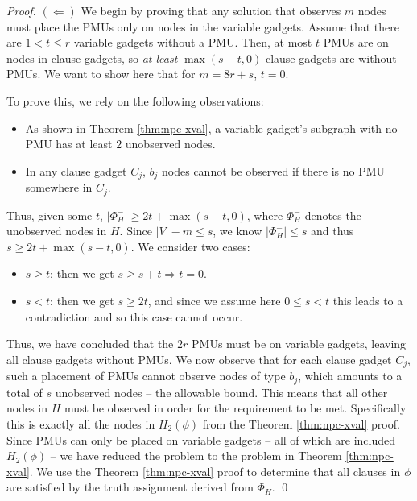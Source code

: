 \begin{proof}
$(\Leftarrow)$
We begin by proving that any solution that observes $m$ nodes must place the PMUs only on nodes in the variable gadgets. Assume that there are $1<t\leq r$ variable gadgets without a PMU.
Then, at most $t$ PMUs are on nodes in clause gadgets, so {\it at least} $\max(s-t,0)$ clause gadgets are without PMUs. We want to show here that for $m=8r+s$, $t=0$.

To prove this, we rely on the following observations:
\begin{itemize}
	\item As shown in Theorem \ref{thm:npc-xval}, a variable gadget's subgraph with no PMU has at least $2$ unobserved nodes.
	\item In any clause gadget $C_j$, $b_j$ nodes cannot be observed if there is no PMU somewhere in $C_j$.
\end{itemize}
Thus, given some $t$, $|\Phi_H^-| \geq 2t + \max(s-t, 0)$, where $\Phi_H^-$ denotes the unobserved nodes in $H$. Since $|V|-m \leq s$, we know $|\Phi_H^-|\leq s$ and thus 
$s \geq 2t + \max(s-t, 0)$. We consider two cases:
\begin{itemize}
	\item $s\geq t$: then we get $s \geq s+t \Rightarrow t=0.$
	\item $s < t$:	then we get $s \geq 2t$, and since we assume here $0\leq s < t$ this leads to a contradiction and so this case cannot occur.
\end{itemize}

Thus, we have concluded that the $2r$ PMUs must be on variable gadgets, leaving all clause gadgets without PMUs. %
We now observe that for each clause gadget $C_j$, such a placement of PMUs cannot observe nodes of type  $b_j$, which amounts to a total of $s$ unobserved nodes -- the allowable bound.
This means that all other nodes in $H$ must be observed in order for the requirement to be met. Specifically this is exactly all the nodes in $H_2(\phi)$ from the Theorem \ref{thm:npc-xval} proof. Since PMUs can only be placed on
variable gadgets -- all of which are included $H_2(\phi)$ -- we have reduced the problem to the problem in Theorem \ref{thm:npc-xval}. We use
the Theorem \ref{thm:npc-xval} proof to determine that all clauses in $\phi$ are satisfied by the truth assignment derived from $\Phi_H$. \qed
\end{proof}



